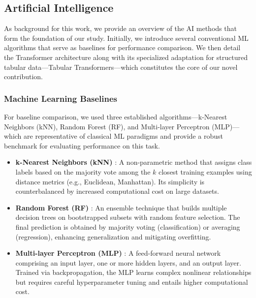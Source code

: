 
\subsection{Artificial Intelligence}
\label{subsec:AI}

As background for this work, we provide an overview of the AI methods that form the foundation of our study. Initially, we introduce several conventional ML algorithms that serve as baselines for performance comparison. We then detail the Transformer architecture along with its specialized adaptation for structured tabular data—Tabular Transformers—which constitutes the core of our novel contribution.

\subsubsection{Machine Learning Baselines}
\label{subsubsec:ML-baselines}

For baseline comparison, we used three established algorithms—k-Nearest Neighbors (kNN), Random Forest (RF), and Multi-layer Perceptron (MLP)—which are representative of classical ML paradigms and provide a robust benchmark for evaluating performance on this task.

\begin{itemize}
    \item \textbf{k-Nearest Neighbors (kNN)} \cite{cover_nearest_1967}: A non-parametric method that assigns class labels based on the majority vote among the $k$ closest training examples using distance metrics (e.g., Euclidean, Manhattan). Its simplicity is counterbalanced by increased computational cost on large datasets.
    
    \item \textbf{Random Forest (RF)} \cite{breiman_random_2001}: An ensemble technique that builds multiple decision trees on bootstrapped subsets with random feature selection. The final prediction is obtained by majority voting (classification) or averaging (regression), enhancing generalization and mitigating overfitting.
    
    \item \textbf{Multi-layer Perceptron (MLP)} \cite{rumelhart_learning_1986}: A feed-forward neural network comprising an input layer, one or more hidden layers, and an output layer. Trained via backpropagation, the MLP learns complex nonlinear relationships but requires careful hyperparameter tuning and entails higher computational cost.
\end{itemize}

